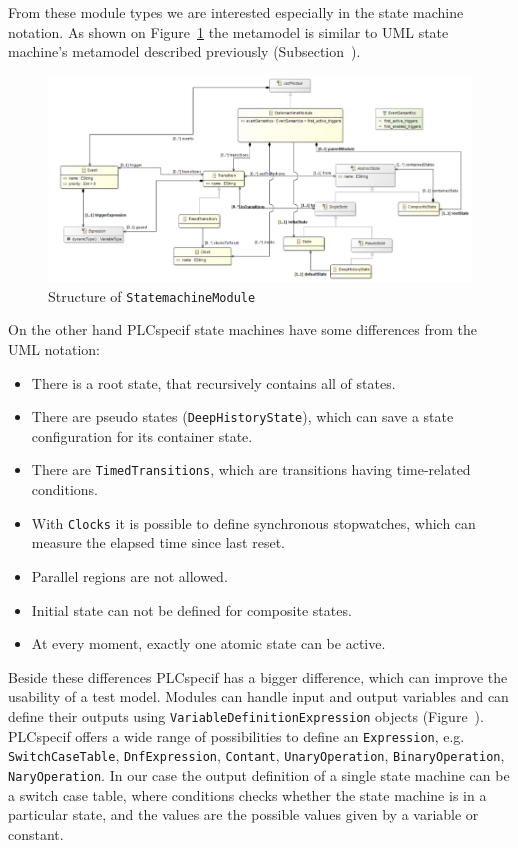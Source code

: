 \begin{enumerate}
From these module types we are interested especially in the state machine notation. As shown on Figure~\ref{fig:plchsm_statemachine} the metamodel is similar to UML state machine's metamodel described previously (Subsection~\cite{ssub:umlstatemachine}).

\begin{figure}[htp]
\centering
\includegraphics[scale=0.5]{figures/plchsm_statemachine}
\caption{Structure of \texttt{StatemachineModule}}
\label{fig:plchsm_statemachine}
\end{figure}

On the other hand PLCspecif state machines have some differences from the UML notation:

\begin{itemize}
	\item There is a root state, that recursively contains all of states.
	\item There are pseudo states (\texttt{DeepHistoryState}), which can save a state configuration for its container state.
	\item There are \texttt{TimedTransitions}, which are transitions having time-related conditions.
	\item With \texttt{Clocks} it is possible to define synchronous stopwatches, which can measure the elapsed time since last reset.
	\item Parallel regions are not allowed.
	\item Initial state can not be defined for composite states.
	\item At every moment, exactly one atomic state can be active. 
\end{itemize}

Beside these differences PLCspecif has a bigger difference, which can improve the usability of a test model. Modules can handle input and output variables and can define their outputs using \texttt{VariableDefinitionExpression} objects (Figure~\cite{fig:plchsm_variables}). PLCspecif offers a wide range of possibilities to define an \texttt{Expression}, e.g. \texttt{SwitchCaseTable}, \texttt{DnfExpression}, \texttt{Contant}, \texttt{UnaryOperation}, \texttt{BinaryOperation}, \texttt{NaryOperation}. In our case the output definition of a single state machine can be a switch case table, where conditions checks whether the state machine is in a particular state, and the values are the possible values given by a variable or constant.


\end{enumerate}

